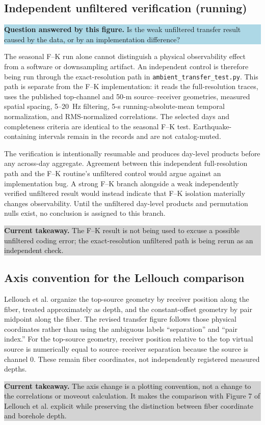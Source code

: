 \documentclass[11pt]{article}
\newcommand{\code}[1]{\texttt{#1}}
\newcommand{\figquestion}[1]{\par\medskip\noindent\colorbox{lightblue}{\parbox{0.95\linewidth}{\textcolor{questionblue}{\textbf{Question answered by this figure.}} #1}}\par\medskip}
\newcommand{\takeaway}[1]{\par\smallskip\noindent\colorbox{lightgray}{\parbox{0.95\linewidth}{\textbf{Current takeaway.} #1}}\par\medskip}
\begin{document}
\subsection{Independent unfiltered verification (running)}
\figquestion{Is the weak unfiltered transfer result caused by the data, or by an implementation difference?}

The seasonal F--K run alone cannot distinguish a physical observability effect from a software or downsampling artifact. An independent control is therefore being run through the exact-resolution path in \code{ambient\_transfer\_test.py}. This path is separate from the F--K implementation: it reads the full-resolution traces, uses the published top-channel and 50-m source--receiver geometries, measured spatial spacing, 5--20~Hz filtering, 5-s running-absolute-mean temporal normalization, and RMS-normalized correlations. The selected days and completeness criteria are identical to the seasonal F--K test. Earthquake-containing intervals remain in the records and are not catalog-muted.

The verification is intentionally resumable and produces day-level products before any across-day aggregate. Agreement between this independent full-resolution path and the F--K routine's unfiltered control would argue against an implementation bug. A strong F--K branch alongside a weak independently verified unfiltered result would instead indicate that F--K isolation materially changes observability. Until the unfiltered day-level products and permutation nulls exist, no conclusion is assigned to this branch.

\takeaway{The F--K result is not being used to excuse a possible unfiltered coding error; the exact-resolution unfiltered path is being rerun as an independent check.}


\subsection{Axis convention for the Lellouch comparison}
Lellouch et al. organize the top-source geometry by receiver position along the fiber, treated approximately as depth, and the constant-offset geometry by pair midpoint along the fiber. The revised transfer figure follows those physical coordinates rather than using the ambiguous labels ``separation'' and ``pair index.'' For the top-source geometry, receiver position relative to the top virtual source is numerically equal to source--receiver separation because the source is channel 0. These remain fiber coordinates, not independently registered measured depths.

\takeaway{The axis change is a plotting convention, not a change to the correlations or moveout calculation. It makes the comparison with Figure 7 of Lellouch et al. explicit while preserving the distinction between fiber coordinate and borehole depth.}
\end{document}
